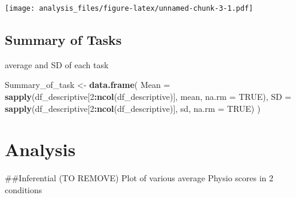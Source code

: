 \documentclass[
]{article}
\newenvironment{Shaded}{\begin{snugshade}}{\end{snugshade}}
\newcommand{\DataTypeTok}[1]{\textcolor[rgb]{0.13,0.29,0.53}{#1}}
\newcommand{\DecValTok}[1]{\textcolor[rgb]{0.00,0.00,0.81}{#1}}
\newcommand{\KeywordTok}[1]{\textcolor[rgb]{0.13,0.29,0.53}{\textbf{#1}}}
\newcommand{\NormalTok}[1]{#1}
\newcommand{\OperatorTok}[1]{\textcolor[rgb]{0.81,0.36,0.00}{\textbf{#1}}}
\newcommand{\OtherTok}[1]{\textcolor[rgb]{0.56,0.35,0.01}{#1}}
\newcommand{\StringTok}[1]{\textcolor[rgb]{0.31,0.60,0.02}{#1}}
\begin{document}
\texttt{[image: analysis\_files/figure-latex/unnamed-chunk-3-1.pdf]}

\hypertarget{summary-of-tasks}{%
\subsection{Summary of Tasks}\label{summary-of-tasks}}

average and SD of each task

\begin{Shaded}
\begin{Highlighting}[]
\NormalTok{Summary_of_task <-}\StringTok{ }\KeywordTok{data.frame}\NormalTok{(}
  \DataTypeTok{Mean =} \KeywordTok{sapply}\NormalTok{(df_descriptive[}\DecValTok{2}\OperatorTok{:}\KeywordTok{ncol}\NormalTok{(df_descriptive)], mean, }\DataTypeTok{na.rm =} \OtherTok{TRUE}\NormalTok{),}
  \DataTypeTok{SD =} \KeywordTok{sapply}\NormalTok{(df_descriptive[}\DecValTok{2}\OperatorTok{:}\KeywordTok{ncol}\NormalTok{(df_descriptive)], sd, }\DataTypeTok{na.rm =} \OtherTok{TRUE}\NormalTok{)}
\NormalTok{)}
\end{Highlighting}
\end{Shaded}

\hypertarget{analysis}{%
\section{Analysis}\label{analysis}}

\#\#Inferential (TO REMOVE) Plot of various average Physio scores in 2
conditions
\end{document}
